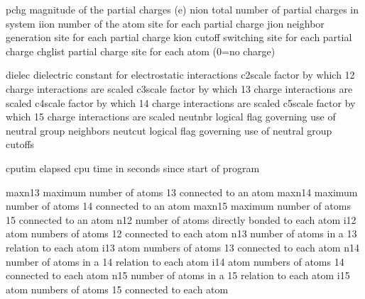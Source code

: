 \documentclass[letterpaper,11pt,english]{sphinxmanual}
\begin{document}

\begin{sphinxVerbatim}[commandchars=\\\{\}]
pchg            magnitude of the partial charges (e\PYGZhy{})
nion            total number of partial charges in system
iion            number of the atom site for each partial charge
jion            neighbor generation site for each partial charge
kion            cutoff switching site for each partial charge
chglist         partial charge site for each atom (0=no charge)
\end{sphinxVerbatim}


\begin{sphinxVerbatim}[commandchars=\\\{\}]
dielec          dielectric constant for electrostatic interactions
c2scale         factor by which 1\PYGZhy{}2 charge interactions are scaled
c3scale         factor by which 1\PYGZhy{}3 charge interactions are scaled
c4scale         factor by which 1\PYGZhy{}4 charge interactions are scaled
c5scale         factor by which 1\PYGZhy{}5 charge interactions are scaled
neutnbr         logical flag governing use of neutral group neighbors
neutcut         logical flag governing use of neutral group cutoffs
\end{sphinxVerbatim}


\begin{sphinxVerbatim}[commandchars=\\\{\}]
cputim          elapsed cpu time in seconds since start of program
\end{sphinxVerbatim}


\begin{sphinxVerbatim}[commandchars=\\\{\}]
maxn13          maximum number of atoms 1\PYGZhy{}3 connected to an atom
maxn14          maximum number of atoms 1\PYGZhy{}4 connected to an atom
maxn15          maximum number of atoms 1\PYGZhy{}5 connected to an atom
n12             number of atoms directly bonded to each atom
i12             atom numbers of atoms 1\PYGZhy{}2 connected to each atom
n13             number of atoms in a 1\PYGZhy{}3 relation to each atom
i13             atom numbers of atoms 1\PYGZhy{}3 connected to each atom
n14             number of atoms in a 1\PYGZhy{}4 relation to each atom
i14             atom numbers of atoms 1\PYGZhy{}4 connected to each atom
n15             number of atoms in a 1\PYGZhy{}5 relation to each atom
i15             atom numbers of atoms 1\PYGZhy{}5 connected to each atom
\end{sphinxVerbatim}
\end{document}
